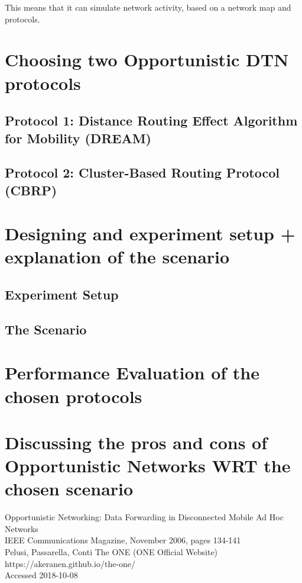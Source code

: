 \documentclass[12pt]{report}
\begin{document}
This means that it can simulate network activity, based on a network map and protocols.

\section{Choosing two Opportunistic DTN protocols}
\subsection{Protocol 1: Distance Routing Effect Algorithm for Mobility (DREAM)}
\subsection{Protocol 2: Cluster-Based Routing Protocol (CBRP)}

\section{Designing and experiment setup + explanation of the scenario}
\subsection{Experiment Setup}
\subsection{The Scenario}

\section{Performance Evaluation of the chosen protocols}

\section{Discussing the pros and cons of Opportunistic Networks WRT the chosen scenario}

\begin{thebibliography}{0}
    Opportunistic Networking: Data Forwarding in Disconnected Mobile Ad Hoc Networks\\
    IEEE Communications Magazine, November 2006, pages 134-141\\
    Pelusi, Passarella, Conti
    The ONE (ONE Official Website)\\
    https://akeranen.github.io/the-one/\\
    Accessed 2018-10-08
\end{thebibliography}
\end{document}
